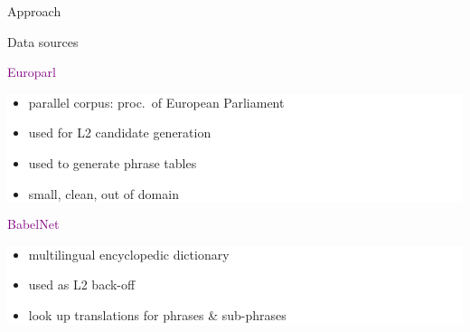 \documentclass[final,t]{beamer}
\begin{document}
\begin{frame}{}
\begin{columns}[t]
\begin{column}{.4\linewidth}
\begin{block}{Approach}

\end{block}

\begin{block}{Data sources}

\begin{center}
\textcolor{purple}{Europarl}
\end{center}

\colorbox{white}{
\begin{minipage}{.85\linewidth}
\begin{itemize}
\item parallel corpus: proc.\ of European Parliament
\item used for L2 candidate generation
\item  used to generate phrase tables
\item small, clean, out of domain
\end{itemize}
\end{minipage}
}

\begin{center}
\textcolor{purple}{BabelNet}
\end{center}

\colorbox{white}{
\begin{minipage}{.85\linewidth}
\begin{itemize}
\item multilingual encyclopedic dictionary
\item used as L2 back-off 
\item look up translations for phrases \& sub-phrases
\end{itemize}
\end{minipage}
}


\end{block}
\end{column}
\end{columns}
\end{frame}
\end{document}
